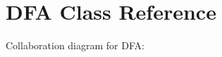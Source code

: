 \hypertarget{classDFA}{}\section{D\+FA Class Reference}
\label{classDFA}


Collaboration diagram for D\+FA\+:
